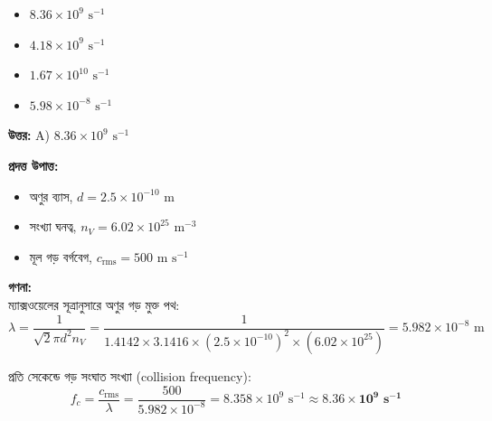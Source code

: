 \documentclass[12pt, a4paper]{article}
\begin{document}
\begin{itemize}[label={}, leftmargin=1cm, itemsep=0.5em]
    \item[\textbf{A)}] $8.36 \times 10^9\text{ s}^{-1}$
    \item[\textbf{B)}] $4.18 \times 10^9\text{ s}^{-1}$
    \item[\textbf{C)}] $1.67 \times 10^{10}\text{ s}^{-1}$
    \item[\textbf{D)}] $5.98 \times 10^{-8}\text{ s}^{-1}$
\end{itemize}

\vspace{0.5em}
\begin{tcolorbox}[answerbox]
    \textbf{\color{success} উত্তর:} A) $8.36 \times 10^9\text{ s}^{-1}$
\end{tcolorbox}
\vspace{1em}

\begin{tcolorbox}[solutionbox={সমাধান (Solution)}]
    \noindent
    \textbf{প্রদত্ত উপাত্ত:}
    \begin{itemize}[leftmargin=1.5em, itemsep=0.2em]
        \item অণুর ব্যাস, $d = 2.5 \times 10^{-10}\text{ m}$
        \item সংখ্যা ঘনত্ব, $n_V = 6.02 \times 10^{25}\text{ m}^{-3}$
        \item মূল গড় বর্গবেগ, $c_{\text{rms}} = 500\text{ m s}^{-1}$
    \end{itemize}

    \vspace{0.6em}
    \noindent\textbf{গণনা:} \\
    ম্যাক্সওয়েলের সূত্রানুসারে অণুর গড় মুক্ত পথ:
    \[ \lambda = \frac{1}{\sqrt{2} \pi d^2 n_V} = \frac{1}{1.4142 \times 3.1416 \times (2.5 \times 10^{-10})^2 \times (6.02 \times 10^{25})} = 5.982 \times 10^{-8}\text{ m} \]
    
    প্রতি সেকেন্ডে গড় সংঘাত সংখ্যা (collision frequency):
    \[ f_c = \frac{c_{\text{rms}}}{\lambda} = \frac{500}{5.982 \times 10^{-8}} = 8.358 \times 10^9\text{ s}^{-1} \approx \mathbf{8.36 \times 10^9\text{ s}^{-1}} \]
\end{tcolorbox}
\end{document}
